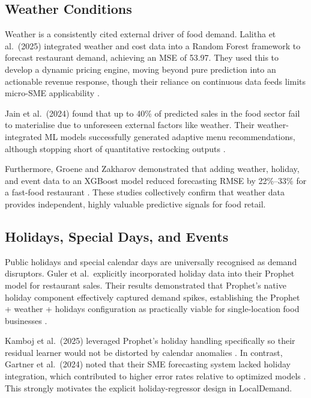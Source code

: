 \documentclass[conference]{IEEEtran}
\begin{document}
\subsection{Weather Conditions}

Weather is a consistently cited external driver of food demand. Lalitha 
et al.\ (2025) integrated weather and cost data into a Random Forest 
framework to forecast restaurant demand, achieving an MSE of 53.97. They 
used this to develop a dynamic pricing engine, moving beyond pure prediction 
into an actionable revenue response, though their reliance on continuous data 
feeds limits micro-SME applicability \cite{lalitha2025}. 

Jain et al.\ (2024) found that up to 40\% of predicted sales in the food 
sector fail to materialise due to unforeseen external factors like weather. 
Their weather-integrated ML models successfully generated adaptive menu 
recommendations, although stopping short of quantitative restocking outputs 
\cite{jain2024}. 

Furthermore, Groene and Zakharov demonstrated that adding weather, holiday, 
and event data to an XGBoost model reduced forecasting RMSE by 22\%--33\% for 
a fast-food restaurant \cite{groene_zakharov}. These studies collectively 
confirm that weather data provides independent, highly valuable predictive 
signals for food retail.

\subsection{Holidays, Special Days, and Events}

Public holidays and special calendar days are universally recognised as 
demand disruptors. Guler et al.\ explicitly incorporated holiday data into 
their Prophet model for restaurant sales. Their results demonstrated that 
Prophet's native holiday component effectively captured demand spikes, 
establishing the Prophet + weather + holidays configuration as practically 
viable for single-location food businesses \cite{guler}.

Kamboj et al.\ (2025) leveraged Prophet's holiday handling specifically so 
their residual learner would not be distorted by calendar anomalies 
\cite{kamboj2025}. In contrast, Gartner et al.\ (2024) noted that their SME 
forecasting system lacked holiday integration, which contributed to higher 
error rates relative to optimized models \cite{gartner2024}. This strongly 
motivates the explicit holiday-regressor design in LocalDemand.
\end{document}
